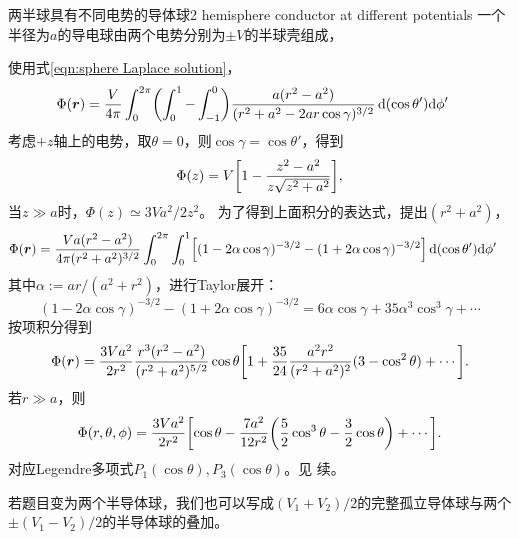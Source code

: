 \begin{example}{两半球具有不同电势的导体球}{2 hemisphere conductor at different potentials}
    一个半径为$a$的导电球由两个电势分别为$\pm V$的半球壳组成，
    \begin{notecaptionblock}
        \label{fig:2 hemisphere}
    \end{notecaptionblock}
    使用式\eqref{eqn:sphere Laplace solution}，
    \begin{align*}
        \Phi(\bm r) &= \frac V{4\pi}\int_0^{2\pi}\biggp{\int_0^1 - \int_{-1}^0}\frac{a(r^2 - a^2)}{(r^2 + a^2 - 2ar\cos\gamma)^{3/2}}\d(\cos\theta')\nd\phi'%
    \end{align*}
    考虑$+z$轴上的电势，取$\theta = 0$，则$\cos\gamma = \cos\theta'$，得到
    \begin{equation}
        \Phi(z) = V\biggl[1 - \frac{z^2 - a^2}{z\sqrt{z^2 + a^2}}\biggr],
    \end{equation}
    当$z \gg a$时，$\Phi(z) \simeq 3Va^2/2z^2$。
    \tcblower
    为了得到上面积分的表达式，提出$(r^2 + a^2)$，
    \begin{align*}
        \Phi(\bm r) &= \frac{Va(r^2 - a^2)}{4\pi(r^2 + a^2)^{3/2}}\int_0^{2\pi}\int_0^1\Bigl[(1 - 2\alpha\cos\gamma)^{-3/2} - (1 + 2\alpha\cos\gamma)^{-3/2}\Bigr]\mathop{}\!\mathrm{d}(\cos\theta')\mathrm{d}\phi'
    \end{align*}
    其中$\alpha := ar/(a^2 + r^2)$，进行Taylor展开：
    \[
        (1 - 2\alpha\cos\gamma)^{-3/2} - (1 + 2\alpha\cos\gamma)^{-3/2} = 6\alpha\cos\gamma + 35\alpha^3\cos^3\gamma + \cdots
    \]
    按项积分得到
    \[
        \Phi(\bm r) = \frac{3Va^2}{2r^2}\frac{r^3(r^2 - a^2)}{(r^2 + a^2)^{5/2}}\cos\theta\biggl[1 + \frac{35}{24}\frac{a^2r^2}{(r^2 + a^2)^2}(3 - \cos^2\theta) + \cdots\biggr].
    \]
    若$r \gg a$，则
    \begin{equation}
        \Phi(r,\theta,\phi) = \frac{3Va^2}{2r^2}\biggl[\cos\theta - \frac{7a^2}{12r^2}\biggl(\frac52\cos^3\theta - \frac32\cos\theta\biggr) + \cdots\biggr].
    \end{equation}
    对应Legendre多项式$P_1(\cos\theta),P_3(\cos\theta)$。见 续。
\end{example}
\begin{remark}
    若题目变为两个半导体球，我们也可以写成$(V_1 + V_2)/2$的完整孤立导体球与两个$\pm(V_1 - V_2)/2$的半导体球的叠加。
\end{remark}

